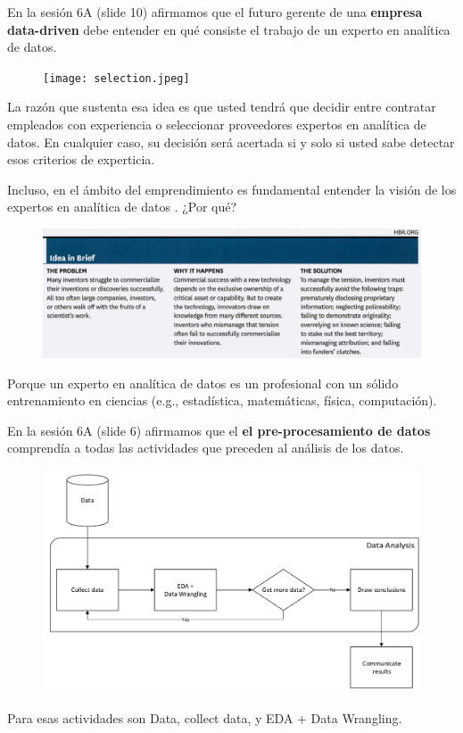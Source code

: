 \documentclass[aspectratio=169]{beamer}
\begin{document}
\begin{frame}
En la sesión 6A (slide 10) afirmamos que el futuro  gerente de una \textbf{empresa data-driven} debe entender en qué consiste el trabajo de un experto en analítica de datos.\\
\begin{figure}
\centering
\texttt{[image: selection.jpeg]}
\end{figure}
La razón que sustenta esa idea es que usted tendrá que decidir entre contratar empleados con experiencia o seleccionar proveedores expertos en analítica de datos. En cualquier caso, su decisión será acertada si y solo si usted sabe detectar esos criterios de experticia.
\end{frame}

\begin{frame}
Incluso, en el ámbito del emprendimiento es fundamental entender la visión de los expertos en analítica de datos \cite{Kotha2014}. ¿Por qué?
\begin{figure}
\centering
\includegraphics[width=.85\textwidth]{Kotha.png}
\end{figure}
Porque un experto en analítica de datos es un profesional con un sólido entrenamiento en ciencias (e.g., estadística, matemáticas, física, computación).
\end{frame}

\begin{frame}
En la sesión 6A (slide 6) afirmamos que el \textbf{el pre-procesamiento de datos} comprendía a todas las actividades que preceden al análisis de los datos. 
\begin{figure}
\centering
\includegraphics[width=.55\textwidth]{DAW.png}
\end{figure}
Para \citeauthor{Molin2021} \citeyear{Molin2021} esas actividades son Data, collect data, y EDA + Data Wrangling.
\end{frame}
\end{document}
